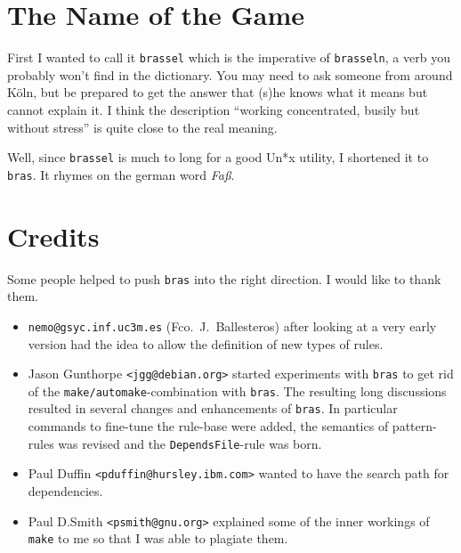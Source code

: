 \documentclass[11pt,bibtotoc,idxtotoc]{scrreprt}
\newcommand{\bras}{\texttt{bras}}
\newcommand{\make}{\texttt{make}}
\begin{document}
\section{The Name of the Game}

First I wanted to call it \texttt{brassel} which is the imperative of
\texttt{brasseln}, a verb you probably won't find in the
dictionary. You may need to ask someone from around K\"oln, but be
prepared to get the answer that (s)he knows what it means but cannot
explain it. I think the description "`working concentrated, busily but
without stress"' is quite close to the real meaning.

Well, since \texttt{brassel} is much to long for a good
Un*x utility, I shortened it to \bras. It rhymes on the german word
\textit{Fa\ss}.

\section{Credits}

Some people helped to push \bras{} into the right direction. I
would like to thank them. 

\begin{itemize}
\item \texttt{nemo@gsyc.inf.uc3m.es} (Fco.\ J.~Ballesteros) after
looking at a very early version had the
idea to allow the definition of new types of rules.

\item Jason Gunthorpe \texttt{<jgg@debian.org>} started experiments
  with \bras{} to get rid of the \texttt{make/automake}-combination
  with \bras{}. The resulting long discussions resulted in several
  changes and enhancements of \bras{}. In particular commands to
  fine-tune the rule-base were added, the semantics of pattern-rules
  was revised and the \texttt{DependsFile}-rule was born.
  
\item Paul Duffin \texttt{<pduffin@hursley.ibm.com>} wanted to have
  the search path for dependencies.
  
\item Paul D.Smith \texttt{<psmith@gnu.org>} explained some of the
  inner workings of \make{} to me so that I was able to plagiate them.
\end{itemize}

\end{document}
